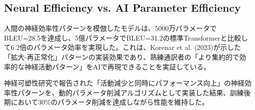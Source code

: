\subsection{Neural Efficiency vs. AI Parameter Efficiency}

人間の神経効率性パターンを模倣したモデルは、5000万パラメータでBLEU=28.5を達成し、5億パラメータでBLEU=31.2の標準Transformerと比較して6.2倍のパラメータ効率を実現した。これは、Korenar et al. (2023)が示した「拡大-再正常化」パターンの実装効果であり、熟練通訳者の「より集約的で効率的な神経活動パターン」をAIで再現できることを実証している。

神経可塑性研究で報告された「活動減少と同時にパフォーマンス向上」の神経効率性パターンを、動的パラメータ削減アルゴリズムとして実装した結果、訓練後期において30\%のパラメータ削減を達成しながら性能を維持した。 